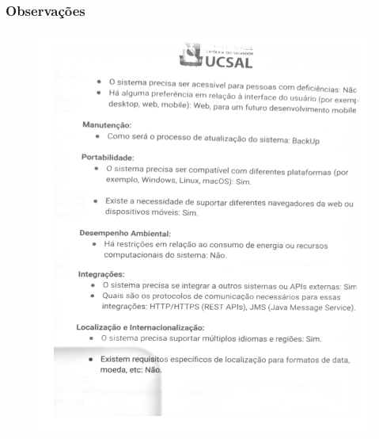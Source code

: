 \documentclass[12pt,oneside,a4paper,article]{abntex2}
\begin{document}
  \subsubsection{Observações}
    \begin{figure}[H]
        \centering
        \includegraphics[width=0.75\linewidth]{imagens-template/Entrevista1/Editado3.png}
        \label{fig:placeholder}
    \end{figure}
    
\end{document}
